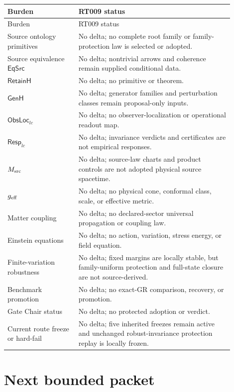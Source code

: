 \documentclass[11pt]{article}
\begin{document}
\begin{longtable}{P{0.29\linewidth}P{0.61\linewidth}}
\toprule
Burden & RT009 status \\
\midrule
\endfirsthead
\toprule
Burden & RT009 status \\
\midrule
\endhead
Source ontology primitives & No delta; no complete root family or family-protection law is selected or adopted. \\
Source equivalence \(\mathsf{EqSrc}\) & No delta; nontrivial arrows and coherence remain supplied conditional data. \\
\(\mathsf{RetainH}\) & No delta; no primitive or theorem. \\
\(\mathsf{GenH}\) & No delta; generator families and perturbation classes remain proposal-only inputs. \\
\(\mathsf{ObsLoc}_{lc}\) & No delta; no observer-localization or operational readout map. \\
\(\mathsf{Resp}_{lc}\) & No delta; invariance verdicts and certificates are not empirical responses. \\
\(M_{\rm src}\) & No delta; source-law charts and product controls are not adopted physical source spacetime. \\
\(g_{\rm eff}\) & No delta; no physical cone, conformal class, scale, or effective metric. \\
Matter coupling & No delta; no declared-sector universal propagation or coupling law. \\
Einstein equations & No delta; no action, variation, stress energy, or field equation. \\
Finite-variation robustness & No delta; fixed margins are locally stable, but family-uniform protection and full-state closure are not source-derived. \\
Benchmark promotion & No delta; no exact-GR comparison, recovery, or promotion. \\
Gate Chair status & No delta; no protected adoption or verdict. \\
Current route freeze or hard-fail & No delta; five inherited freezes remain active and unchanged robust-invariance protection replay is locally frozen. \\
\bottomrule
\end{longtable}

\section{Next bounded packet}
\end{document}
